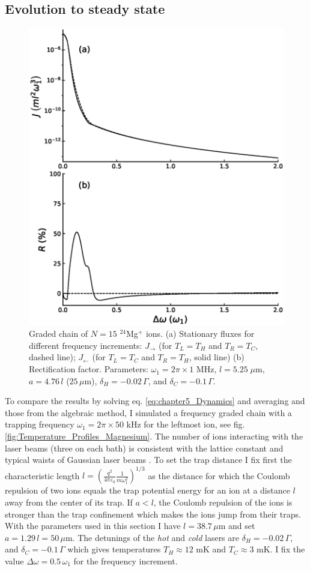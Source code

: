 \subsection{Evolution to steady state \label{Results_A}}

\begin{figure}
  \center
  \includegraphics[width=0.75\linewidth]{Figures/Graded_24Mg_FluxAndRectification_VS_FreqGradient.eps}
  \caption{Graded chain of $N=15$ $^{24}$Mg$^+$ ions. (a) Stationary fluxes for different frequency increments: $J_\rightarrow$   (for $T_L = T_H$ and $T_R = T_C$, dashed line); $J_\leftarrow$ (for $T_L = T_C$ and $T_R = T_H$, solid line) (b) Rectification factor. Parameters: $\omega_1 = 2 \pi \times 1$ MHz, $l = 5.25\;\mu$m, $a = 4.76\, l$ ($25\,\mu$m), $\delta_H = -0.02 \,\Gamma$, and $\delta_C = -0.1 \, \Gamma$.}
  \label{fig:RFG}
\end{figure}

To compare the results by solving eq. \eqref{eq:chapter5_Dynamics} and averaging and those from the algebraic method, I simulated a frequency graded chain with a trapping frequency $\omega_1 = 2\pi \times 50$ kHz for the leftmost ion, see fig. \ref{fig:Temperature_Profiles_Magnesium}.  The number of ions interacting with the laser beams (three on each bath) is consistent with the lattice constant and typical waists of Gaussian laser beams \cite{Leupold2015,Lo2015}. To set the trap distance I fix first the characteristic length  $l =  \left(\frac{q^2}{4\pi\varepsilon_0}\frac{1}{m\omega_1^2}\right)^{1/3}$ as the distance for which the Coulomb repulsion of two ions equals the trap  potential energy for an ion at a distance
$l$ away from the center of its trap.
If $a<l$, the Coulomb repulsion of the ions is stronger than the trap confinement which makes the ions jump from their traps. With the parameters used in this section I have $l = 38.7\,\mu$m and set $a = 1.29 \,l=50\,\mu$m. The detunings of the \textit{hot} and \textit{cold} lasers are $\delta_H = -0.02 \, \Gamma$, and $\delta_C = -0.1 \, \Gamma$ which gives temperatures $T_H \approx 12$ mK and $T_C \approx 3$ mK. I fix the value $\Delta\omega = 0.5 \, \omega_1$ for the frequency increment.

